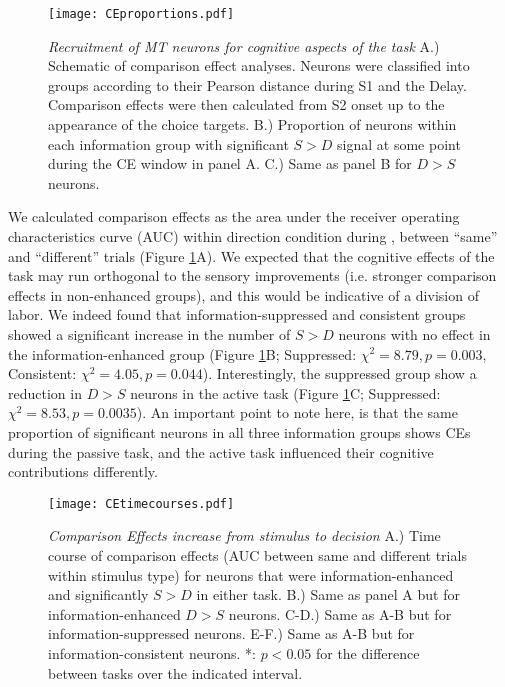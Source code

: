 \begin{figure}
	\centerline{\texttt{[image: CEproportions.pdf]}}
	\caption{\textit{Recruitment of MT neurons for cognitive aspects of the task} A.) Schematic of comparison effect analyses. Neurons were classified into groups according to their Pearson distance during S1 and the Delay. Comparison effects were then calculated from S2 onset up to the appearance of the choice targets. B.) Proportion of neurons within each information group with significant $S>D$ signal at some point during the CE window in panel A. C.) Same as panel B for $D>S$ neurons.}
	\label{fig:CEproportions}
\end{figure}

We calculated comparison effects as the area under the receiver operating characteristics curve (AUC) within direction condition during \test, between ``same'' and ``different'' trials (Figure \ref{fig:CEproportions}A). We expected that the cognitive effects of the task may run orthogonal to the sensory improvements (i.e. stronger comparison effects in non-enhanced groups), and this would be indicative of a division of labor. We indeed found that information-suppressed and consistent groups showed a significant increase in the number of $S>D$ neurons with no effect in the information-enhanced group (Figure \ref{fig:CEproportions}B; Suppressed: $\chi^2=8.79, p=0.003$, Consistent: $\chi^2=4.05, p=0.044$). Interestingly, the suppressed group show a reduction in $D>S$ neurons in the active task (Figure \ref{fig:CEproportions}C; Suppressed: $\chi^2=8.53, p=0.0035$). An important point to note here, is that the same proportion of significant neurons in all three information groups shows CEs during the passive task, and the active task influenced their cognitive contributions differently. 

\begin{figure}	
	\centering
	\texttt{[image: CEtimecourses.pdf]}
	\caption{\textit{Comparison Effects increase from stimulus to decision} A.) Time course of comparison effects (AUC between same and different trials within stimulus type) for neurons that were information-enhanced and significantly $S>D$ in either task. B.) Same as panel A but for information-enhanced $D>S$ neurons. C-D.) Same as A-B but for information-suppressed neurons. E-F.) Same as A-B but for information-consistent neurons. *: $p<0.05$ for the difference between tasks over the indicated interval.}
	\label{fig:CEtimecourses}
\end{figure}

